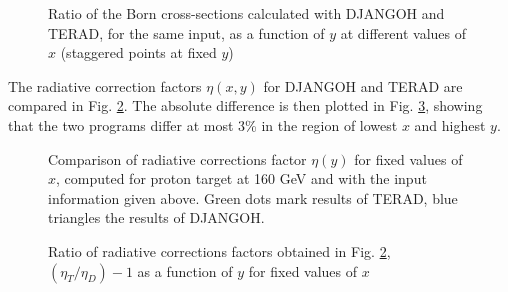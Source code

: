 \begin{figure}[htb]
\centerline{}
\caption{Ratio of the Born cross-sections calculated with DJANGOH and TERAD, for the same input, as a function of $y$
at different values of $x$ (staggered points at fixed $y$)}\label{fig:BRy}
\end{figure}

The radiative correction factors $\eta(x,y)$ for DJANGOH and TERAD are compared in Fig. \ref{fig:RCy}. The absolute difference is then plotted in Fig. \ref{fig:ERy}, showing that the two programs differ at most 3\% in the region of lowest $x$ and highest $y$.


\begin{figure}[htb]
\centerline{}
\caption{Comparison of radiative corrections factor $\eta(y)$ for fixed values of $x$, computed for proton target at 160 GeV
and with the input information given above. Green dots mark results of TERAD, blue triangles the results of DJANGOH.}\label{fig:RCy}
\end{figure}

\begin{figure}[htb]
\centerline{}
\caption{Ratio of radiative corrections factors obtained in Fig. \ref{fig:RCy}, $(\eta_T/\eta_D)-1$ as a function of $y$ for fixed values of $x$}\label{fig:ERy}
\end{figure}
